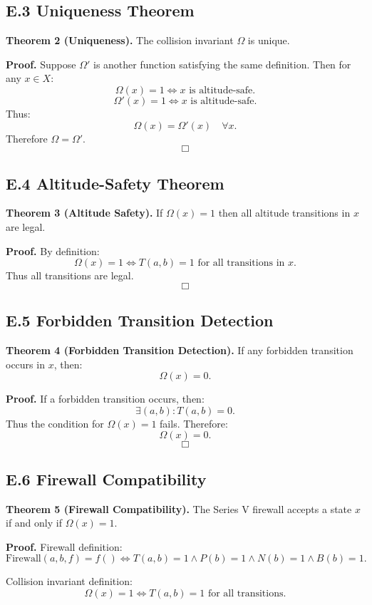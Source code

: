 \subsection*{E.3 Uniqueness Theorem}

\textbf{Theorem 2 (Uniqueness).}  
The collision invariant $\Omega$ is unique.

\textbf{Proof.}  
Suppose $\Omega'$ is another function satisfying the same definition.  
Then for any $x \in X$:
\[
\Omega(x)=1 \iff x \text{ is altitude-safe}.
\]
\[
\Omega'(x)=1 \iff x \text{ is altitude-safe}.
\]
Thus:
\[
\Omega(x)=\Omega'(x) \quad \forall x.
\]
Therefore $\Omega = \Omega'$.  
\[
\Box
\]

\subsection*{E.4 Altitude-Safety Theorem}

\textbf{Theorem 3 (Altitude Safety).}  
If $\Omega(x)=1$ then all altitude transitions in $x$ are legal.

\textbf{Proof.}  
By definition:
\[
\Omega(x)=1 \iff T(a,b)=1 \text{ for all transitions in } x.
\]
Thus all transitions are legal.  
\[
\Box
\]

\subsection*{E.5 Forbidden Transition Detection}

\textbf{Theorem 4 (Forbidden Transition Detection).}  
If any forbidden transition occurs in $x$, then:
\[
\Omega(x)=0.
\]

\textbf{Proof.}  
If a forbidden transition occurs, then:
\[
\exists (a,b) : T(a,b)=0.
\]
Thus the condition for $\Omega(x)=1$ fails.  
Therefore:
\[
\Omega(x)=0.
\]
\[
\Box
\]

\subsection*{E.6 Firewall Compatibility}

\textbf{Theorem 5 (Firewall Compatibility).}  
The Series V firewall accepts a state $x$ if and only if $\Omega(x)=1$.

\textbf{Proof.}  
Firewall definition:
\[
\mathrm{Firewall}(a,b,f)=f()
\iff
T(a,b)=1 \land P(b)=1 \land N(b)=1 \land B(b)=1.
\]

Collision invariant definition:
\[
\Omega(x)=1 \iff T(a,b)=1 \text{ for all transitions}.
\]

